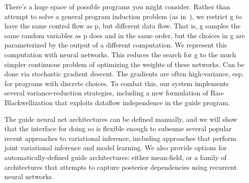 There's a huge space of possible programs you might consider.
Rather than attempt to solve a general program induction problem (as in~\cite{GuidePrograms}), we restrict g to have the same control flow as p, but different data flow.
That is, g samples the same random variables as p does and in the same order, but the choices in g are parameterized by the output of a different computation.
We represent this computation with neural networks.
This reduces the search for g to the much simpler continuous problem of optimizing the weights of these networks.
Can be done via stochastic gradient descent.
The gradients are often high-variance, esp. for programs with discrete choices.
To combat this, our system implements several variance-reduction strategies, including a new formulation of Rao-Blackwellization that exploits dataflow independence in the guide program.

The guide neural net architectures can be defined manually, and we will show that the interface for doing so is flexible enough to subsume several popular recent approaches to variational inference, including approaches that perform joint variational inference and model learning.
We also provide options for automatically-defined guide architectures: either mean-field, or a family of architectures that attempts to capture posterior dependencies using recurrent neural networks.